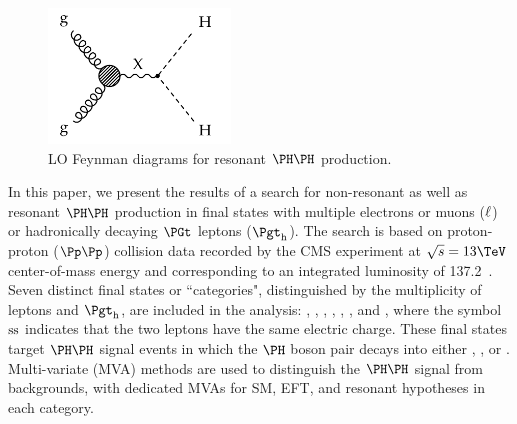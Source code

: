 \begin{figure}[h!]
\setlength{\unitlength}{1mm}
\begin{center}
\includegraphics*[height=36mm]{figures/ggHH_resonant.pdf}
\end{center}
\caption{
  LO Feynman diagrams for resonant $\HH$ production.
}
\label{fig:Feynman_ggHH_resonant}
\end{figure}

In this paper, we present the results of a search for non-resonant as well as resonant $\HH$ production
in final states with multiple electrons or muons ($\Plepton$) or hadronically decaying $\PGt$ leptons ($\tauh$).
The search is based on proton-proton ($\Pp\Pp$) collision data recorded by the CMS experiment at $\sqrt{s} = 13\TeV$ center-of-mass energy
and corresponding to an integrated luminosity of 137.2~\fbinv.
Seven distinct final states or ``categories", distinguished by the multiplicity of leptons and $\tauh$, are included in the analysis:
\twoLeptonssZeroTau, \threeLeptonZeroTau, \fourLeptonZeroTau, \threeLeptonOneTau, \twoLeptonTwoTau, \oneLeptonThreeTau, and \zeroLeptonFourTau,
where the symbol $\ss$ indicates that the two leptons have the same electric charge. 
These final states target $\HH$ signal events in which the $\PHiggs$ boson pair decays into either \WWWW, \WWtt, or \tttt.
Multi-variate (MVA) methods are used to distinguish the $\HH$ signal from backgrounds,
with dedicated MVAs for SM, EFT, and resonant hypotheses in each category.

